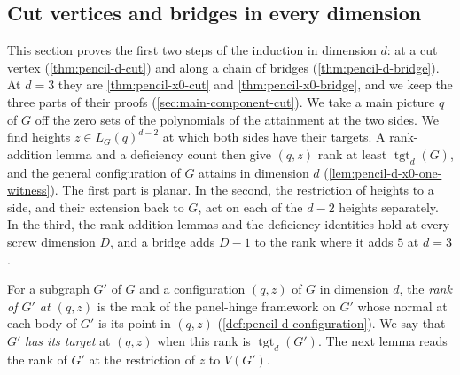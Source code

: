 \subsection{Cut vertices and bridges in every dimension}
\label{sec:pencil-d-cut}

This section proves the first two steps of the induction in dimension
$d$: at a cut vertex (\cref{thm:pencil-d-cut}) and along a chain of
bridges (\cref{thm:pencil-d-bridge}). At $d = 3$ they are
\cref{thm:pencil-x0-cut} and \cref{thm:pencil-x0-bridge}, and we keep
the three parts of their proofs (\cref{sec:main-component-cut}). We take
a main picture $q$ of $G$ off the zero sets of the polynomials of the
attainment at the two sides. We find heights $z \in L_G(q)^{d-2}$ at
which both sides have their targets. A rank-addition lemma and a
deficiency count then give $(q, z)$ rank at least
$\operatorname{tgt}_d(G)$, and the general configuration of $G$ attains
in dimension $d$ (\cref{lem:pencil-d-x0-one-witness}). The first part is
planar. In the second, the restriction of heights to a side, and their
extension back to $G$, act on each of the $d - 2$ heights separately. In
the third, the rank-addition lemmas and the deficiency identities hold
at every screw dimension $D$, and a bridge adds $D - 1$ to the rank
where it adds $5$ at $d = 3$.

For a subgraph $G'$ of $G$ and a configuration $(q, z)$ of $G$ in
dimension $d$, the \emph{rank of $G'$ at $(q, z)$} is the rank of the
panel-hinge framework on $G'$ whose normal at each body of $G'$ is its
point in $(q, z)$ (\cref{def:pencil-d-configuration}). We say that $G'$
\emph{has its target} at $(q, z)$ when this rank is
$\operatorname{tgt}_d(G')$. The next lemma reads the rank of $G'$ at the
restriction of $z$ to $V(G')$.

